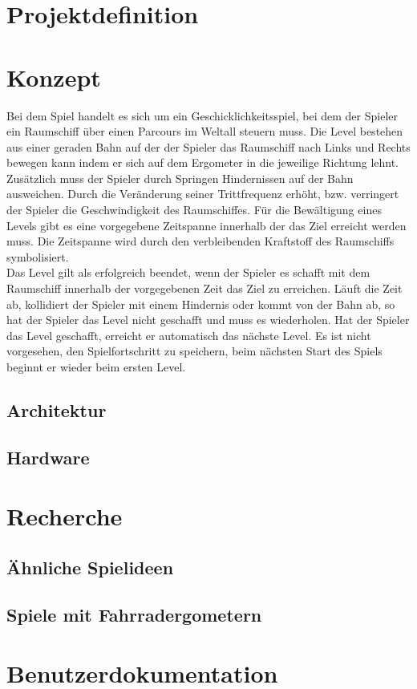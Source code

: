 

\chapter{Projektdefinition}


\chapter{Konzept}
Bei dem Spiel handelt es sich um ein Geschicklichkeitsspiel, bei dem der Spieler ein Raumschiff über einen Parcours im Weltall steuern muss. Die Level bestehen aus einer geraden Bahn auf der der Spieler das Raumschiff nach Links und Rechts bewegen kann indem er sich auf dem Ergometer in die jeweilige Richtung lehnt. Zusätzlich muss der Spieler durch Springen Hindernissen auf der Bahn ausweichen. Durch die Veränderung seiner Trittfrequenz erhöht, bzw. verringert der Spieler die Geschwindigkeit des Raumschiffes. Für die Bewältigung eines Levels gibt es eine vorgegebene Zeitspanne innerhalb der das Ziel erreicht werden muss. Die Zeitspanne wird durch den verbleibenden Kraftstoff des Raumschiffs symbolisiert.\\
Das Level gilt als erfolgreich beendet, wenn der Spieler es schafft mit dem Raumschiff innerhalb der vorgegebenen Zeit das Ziel zu erreichen. Läuft die Zeit ab, kollidiert der Spieler mit einem Hindernis oder kommt von der Bahn ab, so hat der Spieler das Level nicht geschafft und muss es wiederholen. Hat der Spieler das Level geschafft, erreicht er automatisch das nächste Level. Es ist nicht vorgesehen, den Spielfortschritt zu speichern, beim nächsten Start des Spiels beginnt er wieder beim ersten Level.
\section{Architektur}

\section{Hardware}


 
\chapter{Recherche}
\section{Ähnliche Spielideen}


\section{Spiele mit Fahrradergometern}
\label{StateOfTheArt}








\chapter{Benutzerdokumentation}


